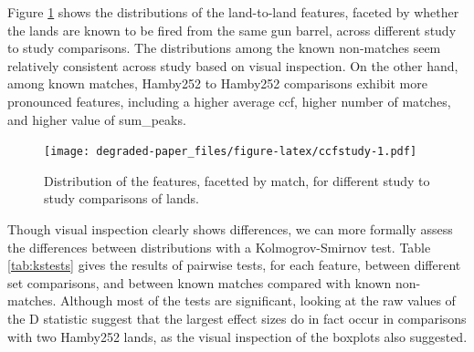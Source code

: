 \documentclass[12pt,]{article}
\theoremstyle{definition}
\theoremstyle{definition}
\theoremstyle{definition}
\theoremstyle{remark}
\begin{document}
Figure \ref{fig:ccfstudy} shows the distributions of the land-to-land
features, faceted by whether the lands are known to be fired from the
same gun barrel, across different study to study comparisons. The
distributions among the known non-matches seem relatively consistent
across study based on visual inspection. On the other hand, among known
matches, Hamby252 to Hamby252 comparisons exhibit more pronounced
features, including a higher average ccf, higher number of matches, and
higher value of sum\_peaks.

\begin{figure}[htbp]
\centering
\texttt{[image: degraded-paper\_files/figure-latex/ccfstudy-1.pdf]}
\caption{\label{fig:ccfstudy}Distribution of the features, facetted by
match, for different study to study comparisons of lands.}
\end{figure}

Though visual inspection clearly shows differences, we can more formally
assess the differences between distributions with a Kolmogrov-Smirnov
test. Table \ref{tab:kstests} gives the results of pairwise tests, for
each feature, between different set comparisons, and between known
matches compared with known non-matches. Although most of the tests are
significant, looking at the raw values of the D statistic suggest that
the largest effect sizes do in fact occur in comparisons with two
Hamby252 lands, as the visual inspection of the boxplots also suggested.
\end{document}
